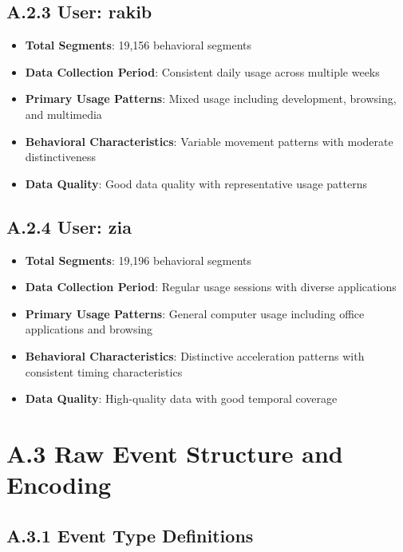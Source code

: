 \documentclass[
  12pt,
  a4paper,
]{report}
\providecommand{\tightlist}{%
  \setlength{\itemsep}{0pt}\setlength{\parskip}{0pt}}
\begin{document}
\subsection{A.2.3 User: rakib}\label{a.2.3-user-rakib}

\begin{itemize}
\tightlist
\item
  \textbf{Total Segments}: 19,156 behavioral segments
\item
  \textbf{Data Collection Period}: Consistent daily usage across
  multiple weeks
\item
  \textbf{Primary Usage Patterns}: Mixed usage including development,
  browsing, and multimedia
\item
  \textbf{Behavioral Characteristics}: Variable movement patterns with
  moderate distinctiveness
\item
  \textbf{Data Quality}: Good data quality with representative usage
  patterns
\end{itemize}

\subsection{A.2.4 User: zia}\label{a.2.4-user-zia}

\begin{itemize}
\tightlist
\item
  \textbf{Total Segments}: 19,196 behavioral segments
\item
  \textbf{Data Collection Period}: Regular usage sessions with diverse
  applications
\item
  \textbf{Primary Usage Patterns}: General computer usage including
  office applications and browsing
\item
  \textbf{Behavioral Characteristics}: Distinctive acceleration patterns
  with consistent timing characteristics
\item
  \textbf{Data Quality}: High-quality data with good temporal coverage
\end{itemize}

\section{A.3 Raw Event Structure and
Encoding}\label{a.3-raw-event-structure-and-encoding}

\subsection{A.3.1 Event Type
Definitions}\label{a.3.1-event-type-definitions}
\end{document}
